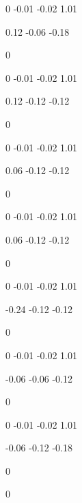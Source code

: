 0
-0.01
-0.02
1.01

0.12
-0.06
-0.18

0

0
-0.01
-0.02
1.01

0.12
-0.12
-0.12

0

0
-0.01
-0.02
1.01

0.06
-0.12
-0.12

0

0
-0.01
-0.02
1.01

0.06
-0.12
-0.12

0

0
-0.01
-0.02
1.01

-0.24
-0.12
-0.12

0

0
-0.01
-0.02
1.01

-0.06
-0.06
-0.12

0

0
-0.01
-0.02
1.01

-0.06
-0.12
-0.18

0

0
